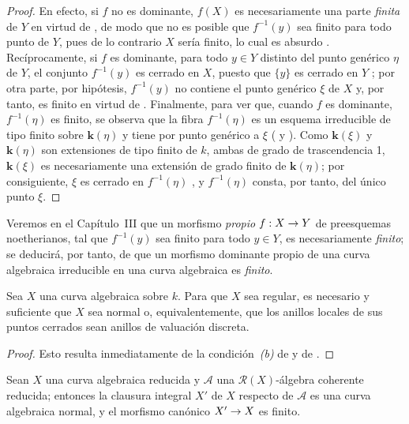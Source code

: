 \documentclass[oneside,10pt]{amsart}
\makeatletter
\newcommand{\ega@arrow}[2]{\mathchoice{#1}{#2}{#2}{#2}}
\renewcommand{\to}{\ega@arrow{\longrightarrow}{\rightarrow}}
\let\EGAOriginalLabel\label
\renewcommand{\label}[1]{\phantomsection\EGAOriginalLabel{#1}}
\makeatother
\begin{document}
\begin{proof}
En efecto, si $f$ no es dominante, $f(X)$ es necesariamente una parte \emph{finita} de $Y$ en virtud de , de modo que no es posible que $f^{-1}(y)$ sea finito para todo punto de $Y$, pues de lo contrario $X$ sería finito, lo cual es absurdo .
Recíprocamente, si $f$ es dominante, para todo $y\in Y$ distinto del punto genérico $\eta$ de $Y$, el conjunto $f^{-1}(y)$ es cerrado en $X$, puesto que $\{y\}$ es cerrado en $Y$ ;
por otra parte, por hipótesis, $f^{-1}(y)$ no contiene el punto genérico $\xi$ de $X$ y, por tanto, es finito en virtud de .
Finalmente, para ver que, cuando $f$ es dominante, $f^{-1}(\eta)$ es finito, se observa que la fibra $f^{-1}(\eta)$ es un esquema irreducible de tipo finito sobre $\boldsymbol{k}(\eta)$ y tiene por punto genérico a $\xi$ ( y ).
Como $\boldsymbol{k}(\xi)$ y $\boldsymbol{k}(\eta)$ son extensiones de tipo finito de $k$, ambas de grado de trascendencia 1, $\boldsymbol{k}(\xi)$ es necesariamente una extensión de grado finito de $\boldsymbol{k}(\eta)$; por consiguiente, $\xi$ es cerrado en $f^{-1}(\eta)$ , y $f^{-1}(\eta)$ consta, por tanto, del único punto $\xi$.
\end{proof}

Veremos en el Capítulo~III que un morfismo \emph{propio} $f:X\to Y$ de preesquemas noetherianos, tal que $f^{-1}(y)$ sea finito para todo $y\in Y$, es necesariamente \emph{finito};
se deducirá, por tanto, de  que un morfismo dominante propio de una curva algebraica irreducible en una curva algebraica es \emph{finito}.

\begin{corollary}[7.4.5]
\label{II.7.4.5-fr}
Sea $X$ una curva algebraica sobre $k$.
Para que $X$ sea regular, es necesario y suficiente que $X$ sea normal o, equivalentemente, que los anillos locales de sus puntos cerrados sean anillos de valuación discreta.
\end{corollary}

\begin{proof}
Esto resulta inmediatamente de la condición~\emph{(b)} de  y de .
\end{proof}

\begin{corollary}[7.4.6]
\label{II.7.4.6-fr}
Sean $X$ una curva algebraica reducida y $\mathcal{A}$ una $\mathcal{R}(X)$-álgebra coherente reducida;
entonces la clausura integral $X'$ de $X$ respecto de $\mathcal{A}$  es una curva algebraica normal, y el morfismo canónico $X'\to X$ es finito.
\end{corollary}
\end{document}
